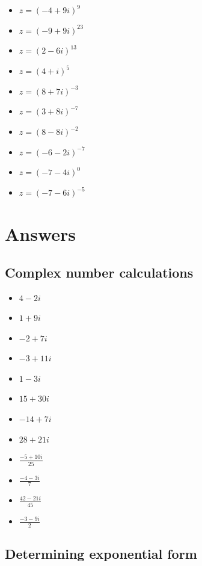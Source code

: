 \documentclass[
]{book}
\providecommand{\tightlist}{%
  \setlength{\itemsep}{0pt}\setlength{\parskip}{0pt}}
\begin{document}
\begin{itemize}
\tightlist
\item
  \(z = (-4+9i)^{9}\)
\item
  \(z = (-9+9i)^{23}\)
\item
  \(z = (2-6i)^{13}\)
\item
  \(z = (4+i)^{5}\)
\item
  \(z = (8+7i)^{-3}\)
\item
  \(z = (3+8i)^{-7}\)
\item
  \(z = (8-8i)^{-2}\)
\item
  \(z = (-6-2i)^{-7}\)
\item
  \(z = (-7-4i)^{0}\)
\item
  \(z = (-7-6i)^{-5}\)
\end{itemize}

\hypertarget{sec:answers7}{%
\section{Answers}\label{sec:answers7}}

\hypertarget{complex-number-calculations-1}{%
\subsection{Complex number calculations}\label{complex-number-calculations-1}}

\begin{itemize}
\tightlist
\item
  \(4-2i\)
\item
  \(1+9i\)
\item
  \(-2+7i\)
\item
  \(-3+11i\)
\item
  \(1-3i\)
\item
  \(15 + 30i\)
\item
  \(-14+7i\)
\item
  \(28+21i\)
\item
  \(\frac{-5+10i}{25}\)
\item
  \(\frac{-4-3i}{7}\)
\item
  \(\frac{42-21i}{45}\)
\item
  \(\frac{-3-9i}{2}\)
\end{itemize}

\hypertarget{determining-exponential-form-1}{%
\subsection{Determining exponential form}\label{determining-exponential-form-1}}
\end{document}
